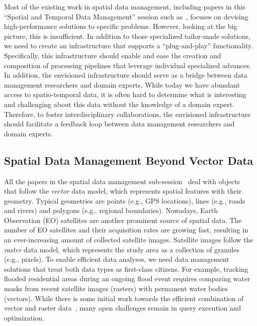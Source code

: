 \documentclass[11pt,dvipdfm]{article}
\begin{document}
Most of the existing work in spatial data management, including papers in this ``Spatial and Temporal Data Management'' session such as~\cite{conf/icde/CVS2022, conf/icde/ZLSYS2022}, focuses on devising high-performance solutions to specific problems. 
However, looking at the big picture, this is insufficient.
In addition to those specialized tailor-made solutions, we need to create an infrastructure that supports a ``plug-and-play'' functionality. 
Specifically, this infrastructure should enable and ease the creation and composition of processing pipelines that leverage individual specialized advances.
In addition, the envisioned infrastructure should serve as a bridge between data management researchers and domain experts. 
While today we have abundant access to spatio-temporal data, it is often hard to determine what is interesting and challenging about this data without the knowledge of a domain expert. 
Therefore, to foster interdisciplinary collaborations, the envisioned infrastructure should facilitate a feedback loop between data management researchers and domain experts.  

\subsection{Spatial Data Management Beyond Vector Data}

All the papers in the spatial data management sub-session~\cite{conf/icde/CVS2022, conf/icde/DF2022, conf/icde/ZLSYS2022} deal with objects that follow the \emph{vector} data model, which represents spatial features with their geometry.
Typical geometries are points (e.g., GPS locations), lines (e.g., roads and rivers) and polygons (e.g., regional boundaries).
Nowadays, Earth Observation (EO) satellites are another prominent source of spatial data.
The number of EO satellites and their acquisition rates are growing fast, resulting in an ever-increasing amount of collected satellite images.
Satellite images follow the \emph{raster} data model, which represents the study area as a collection of granules (e.g., pixels). 
To enable efficient data analyses, we need data management solutions that treat both data types as first-class citizens.
For example, tracking flooded residential areas during an ongoing flood event requires comparing water masks from recent satellite images (rasters) with permanent water bodies (vectors). 
While there is some initial work towards the efficient combination of vector and raster data~\cite{DBLP:conf/gis/SinglaEDMS21},  many open challenges remain in query execution and optimization.
\end{document}
